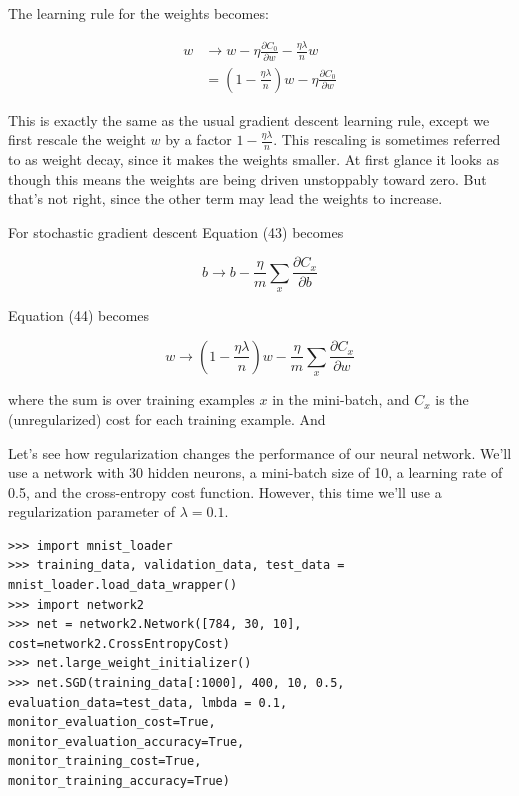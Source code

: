 \documentclass[12 pt]{article}
\begin{document}
The learning rule for the weights becomes:

\begin{equation}
    \begin{split}
        w & \to w − \eta \frac{\partial C_0}{\partial w} -
        \frac{\eta \lambda}{n} w \\
        &= \left (1 - \frac{\eta \lambda}{n} \right ) w - \eta
        \frac{\partial C_0}{\partial w}
    \end{split}
\end{equation}

This is exactly the same as the usual gradient descent learning rule,
except we first rescale the weight $ w $ by a factor $ 1 - \frac{\eta \lambda}{n} $.
This rescaling is sometimes referred to as
weight decay, since it makes the weights smaller. At first glance it
looks as though this means the weights are being driven unstoppably
toward zero. But that's not right, since the other term may lead the
weights to increase.

For stochastic gradient descent Equation (43) becomes

\begin{equation}
    b \to b - \frac{\eta}{m} \sum_x \frac{\partial C_x}{\partial b}
\end{equation}

Equation (44) becomes

\begin{equation}
    w \to \left (1 - \frac{\eta \lambda}{n} \right ) w -
    \frac{\eta}{m} \sum_x \frac{\partial C_x}{\partial w}
\end{equation}

where the sum is over training examples $ x $ in the mini-batch, and
$ C_x $ is the (unregularized) cost for each training example. And

Let's see how regularization changes the performance of our neural
network. We'll use a network with 30 hidden neurons, a mini-batch size
of 10, a learning rate of 0.5, and the cross-entropy cost function.
However, this time we'll use a regularization parameter of $ \lambda =
0.1 $.

\begin{verbatim}
>>> import mnist_loader
>>> training_data, validation_data, test_data =
mnist_loader.load_data_wrapper()
>>> import network2
>>> net = network2.Network([784, 30, 10],
cost=network2.CrossEntropyCost)
>>> net.large_weight_initializer()
>>> net.SGD(training_data[:1000], 400, 10, 0.5,
evaluation_data=test_data, lmbda = 0.1,
monitor_evaluation_cost=True,
monitor_evaluation_accuracy=True,
monitor_training_cost=True,
monitor_training_accuracy=True)
\end{verbatim}
\end{document}

